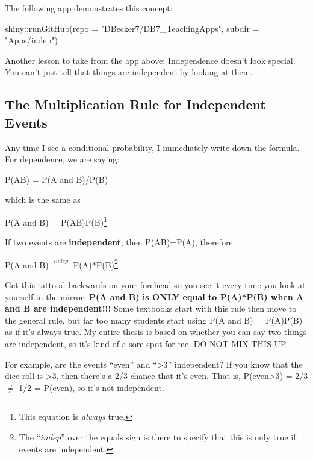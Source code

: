 \documentclass[
  letterpaper,
  DIV=11,
  numbers=noendperiod,
  oneside]{scrreprt}
\newenvironment{Shaded}{\begin{snugshade}}{\end{snugshade}}
\newcommand{\AttributeTok}[1]{\textcolor[rgb]{0.40,0.45,0.13}{#1}}
\newcommand{\FunctionTok}[1]{\textcolor[rgb]{0.28,0.35,0.67}{#1}}
\newcommand{\NormalTok}[1]{\textcolor[rgb]{0.00,0.23,0.31}{#1}}
\newcommand{\SpecialCharTok}[1]{\textcolor[rgb]{0.37,0.37,0.37}{#1}}
\newcommand{\StringTok}[1]{\textcolor[rgb]{0.13,0.47,0.30}{#1}}
\begin{document}
The following app demonstrates this concept:

\begin{Shaded}
\begin{Highlighting}[]
\NormalTok{shiny}\SpecialCharTok{::}\FunctionTok{runGitHub}\NormalTok{(}\AttributeTok{repo =} \StringTok{"DBecker7/DB7\_TeachingApps"}\NormalTok{, }
    \AttributeTok{subdir =} \StringTok{"Apps/indep"}\NormalTok{)}
\end{Highlighting}
\end{Shaded}

Another lesson to take from the app above: Independence doesn't look
special. You can't just tell that things are independent by looking at
them.

\hypertarget{the-multiplication-rule-for-independent-events}{%
\subsection{The Multiplication Rule for Independent
Events}\label{the-multiplication-rule-for-independent-events}}

Any time I see a conditional probability, I immediately write down the
formula. For dependence, we are saying:

P(A\textbar B) = P(A and B)/P(B)

which is the same as

P(A and B) = P(A\textbar B)P(B)\footnote{This equation is \emph{always}
  true.}

If two events are \textbf{independent}, then P(A\textbar B)=P(A),
therefore:

P(A and B) \(\stackrel{indep}{=}\) P(A)*P(B)\footnote{The ``\(indep\)''
  over the equals sign is there to specify that this is only true if
  events are independent.}

Get this tattood backwards on your forehead so you see it every time you
look at yourself in the mirror: \textbf{P(A and B) is ONLY equal to
P(A)*P(B) when A and B are independent!!!} Some textbooks start with
this rule then move to the general rule, but far too many students start
using P(A and B) = P(A)P(B) as if it's always true. My entire thesis is
based on whether you can say two things are independent, so it's kind of
a sore spot for me. DO NOT MIX THIS UP.

For example, are the events ``even'' and ``\textgreater3'' independent?
If you know that the dice roll is \textgreater3, then there's a 2/3
chance that it's even. That is, P(even\textbar\textgreater3) = 2/3
\(\ne\) 1/2 = P(even), so it's not independent.
\end{document}
